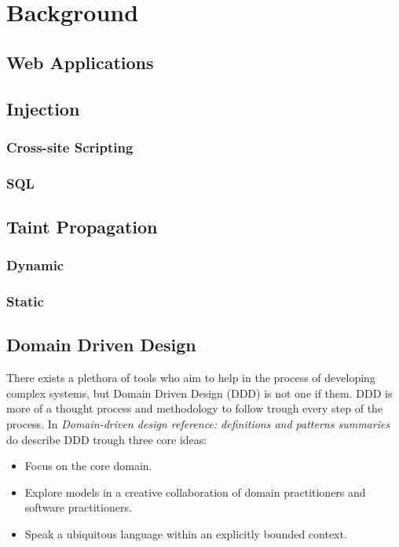 \chapter{Background}


\section{Web Applications}

\section{Injection}
\subsection{Cross-site Scripting}
\subsection{SQL}

\section{Taint Propagation}
\subsection{Dynamic}
\subsection{Static}

\section{Domain Driven Design}
There exists a plethora of tools who aim to help in the process of developing complex systems, but Domain Driven Design (DDD) is not one if them. DDD is more of a thought process and methodology to follow trough every step of the process. \parencite{EvansEric2004Dd:t} In \emph{Domain-driven design reference: definitions and patterns summaries} do \textcite{evans_2015} describe DDD trough three core ideas:

\begin{itemize}
  \item Focus on the core domain.
  \item Explore models in a creative collaboration of domain practitioners and software practitioners.
  \item Speak a ubiquitous language within an explicitly bounded context.
\end{itemize}

